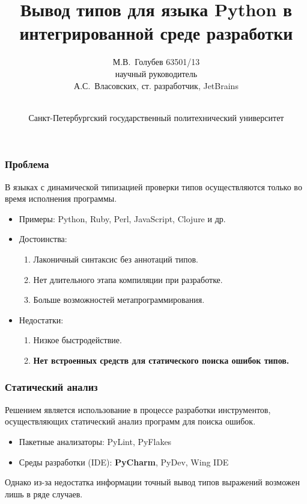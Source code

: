 \documentclass[handout]{beamer}
\title[Вывод типов для Python в IDE]{ Вывод типов для языка Python в интегрированной среде разработки }
\author[М.В.~Голубев]{%
  М.В.~Голубев 63501/13 \\ \vspace{.10cm} 
  {\small научный руководитель} \\ \vspace{.10cm} А.С.~Власовских, ст. разработчик, JetBrains
}
\institute[СПбГПУ]{
  \normalsize
  Направление: 230100 --- Информатика и вычислительная техника \\

  Магистерская программа: 230100.68.15 --- Технологии проектирования системного и
  прикладного программного обеспечения
}
\date[20.06.2014]{%
  \\ \vspace{1cm}
  \footnotesize Санкт-Петербургский государственный политехнический университет
}
\begin{document}
\frame{\titlepage}

\begin{frame}
  \frametitle{Проблема}

  В языках с динамической типизацией проверки типов осуществляются только во время исполнения программы.
  \begin{itemize}
      \item Примеры: Python, Ruby, Perl, JavaScript, Clojure и др.
      \item Достоинства:
        \begin{enumerate}
            \item Лаконичный синтаксис без аннотаций типов.
            \item Нет длительного этапа компиляции при разработке.
            \item Больше возможностей метапрограммирования.
        \end{enumerate}
      \item Недостатки:
        \begin{enumerate}
            \item Низкое быстродействие.
            \item \textbf{Нет встроенных средств для статического поиска ошибок типов.}
        \end{enumerate}
  \end{itemize}
    
\end{frame}



\begin{frame}
  \frametitle{Статический анализ}

  Решением является использование в процессе разработки инструментов,
  осуществляющих статический анализ программ для поиска ошибок.

  \begin{itemize}
      \item Пакетные анализаторы: PyLint, PyFlakes
      \item Среды разработки (IDE): \textbf{PyCharm}, PyDev, Wing IDE
  \end{itemize}
    
  Однако из-за недостатка информации точный вывод типов выражений возможен лишь
  в ряде случаев.

\end{frame}
\end{document}
